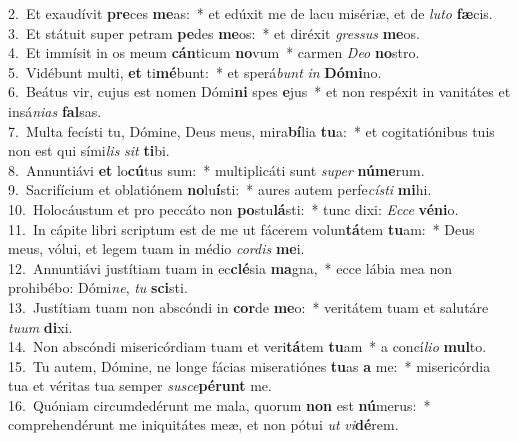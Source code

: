 {2.~}Et exaudívit \textbf{pre}ces \textbf{me}as:~* et edúxit me de lacu misériæ, et de \textit{lu}\textit{to} \textbf{fæ}cis.\\
{3.~}Et státuit super petram \textbf{pe}des \textbf{me}os:~* et diréxit \textit{gres}\textit{sus} \textbf{me}os.\\
{4.~}Et immísit in os meum \textbf{cán}ticum \textbf{no}vum~* carmen \textit{De}\textit{o} \textbf{no}stro.\\
{5.~}Vidébunt multi, \textbf{et} ti\textbf{mé}bunt:~* et sperá\textit{bunt} \textit{in} \textbf{Dó}\textbf{mi}no.\\
{6.~}Beátus vir, cujus est nomen Dómi\textbf{ni} spes \textbf{e}jus~* et non respéxit in vanitátes et insá\textit{ni}\textit{as} \textbf{fal}sas.\\
{7.~}Multa fecísti tu, Dómine, Deus meus, mira\textbf{bí}lia \textbf{tu}a:~* et cogitatiónibus tuis non est qui sími\textit{lis} \textit{sit} \textbf{ti}bi.\\
{8.~}Annuntiávi \textbf{et} lo\textbf{cú}tus sum:~* multiplicáti sunt \textit{su}\textit{per} \textbf{nú}\textbf{me}rum.\\
{9.~}Sacrifícium et oblatiónem \textbf{no}lu\textbf{í}sti:~* aures autem perfe\textit{cí}\textit{sti} \textbf{mi}hi.\\
{10.~}Holocáustum et pro peccáto non \textbf{po}stu\textbf{lá}sti:~* tunc dixi: \textit{Ec}\textit{ce} \textbf{vé}\textbf{ni}o.\\
{11.~}In cápite libri scriptum est de me ut fácerem volun\textbf{tá}tem \textbf{tu}am:~* Deus meus, vólui, et legem tuam in médio \textit{cor}\textit{dis} \textbf{me}i.\\
{12.~}Annuntiávi justítiam tuam in ec\textbf{clé}sia \textbf{ma}gna,~* ecce lábia mea non prohibébo: Dómi\textit{ne}, \textit{tu} \textbf{sci}sti.\\
{13.~}Justítiam tuam non abscóndi in \textbf{cor}de \textbf{me}o:~* veritátem tuam et salutáre \textit{tu}\textit{um} \textbf{di}xi.\\
{14.~}Non abscóndi misericórdiam tuam et veri\textbf{tá}tem \textbf{tu}am~* a concí\textit{li}\textit{o} \textbf{mul}to.\\
{15.~}Tu autem, Dómine, ne longe fácias miseratiónes \textbf{tu}as \textbf{a} me:~* misericórdia tua et véritas tua semper \textit{su}\textit{sce}\textbf{pé}\textbf{runt} me.\\
{16.~}Quóniam circumdedérunt me mala, quorum \textbf{non} est \textbf{nú}merus:~* comprehendérunt me iniquitátes meæ, et non pótui \textit{ut} \textit{vi}\textbf{dé}rem.\\

